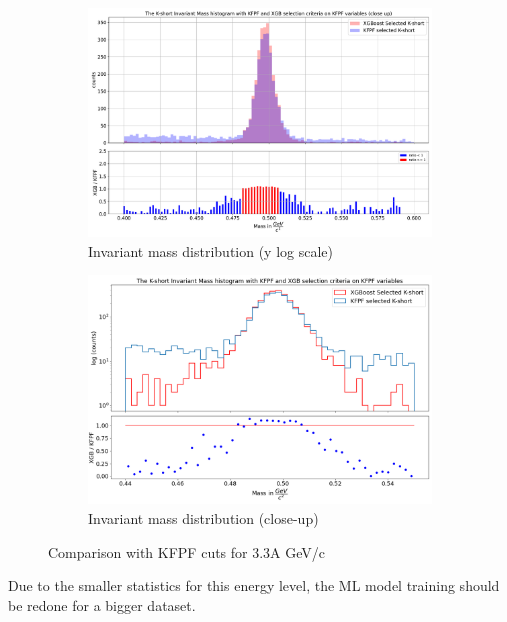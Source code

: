 \begin{figure}[h!]
 \centering
    \begin{subfigure}[b]{0.99\linewidth} 
        \centering
        \includegraphics[width=\textwidth]{img/kaon_inv_mass_comparison_closeup.pdf} 
        \caption{Invariant mass distribution (y log scale)} 
        \vspace{0.3cm}
    \end{subfigure}
     \hfill
       \begin{subfigure}[b]{0.99\linewidth}
        \centering
        \includegraphics[width=\textwidth]{img/circle_kshort_invmass_with_ML.png} 
        \caption{Invariant mass distribution (close-up)}
        \vspace{0.3cm}
    \end{subfigure}
    \caption{Comparison with KFPF cuts for 3.3A GeV/c}\label{33agev}
\end{figure}
Due to the smaller statistics for this energy level, the ML model training should be redone for a bigger dataset.

